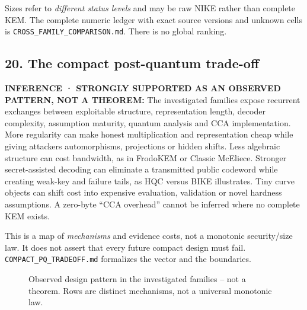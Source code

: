 \documentclass[
  10pt,
  a4paper,
]{article}
\begin{document}
Sizes refer to \emph{different status levels} and may be raw NIKE rather
than complete KEM. The complete numeric ledger with exact source
versions and unknown cells is \texttt{CROSS\_FAMILY\_COMPARISON.md}.
There is no global ranking.

\hypertarget{the-compact-post-quantum-trade-off}{%
\subsection{20. The compact post-quantum
trade-off}\label{the-compact-post-quantum-trade-off}}

\textbf{INFERENCE · STRONGLY SUPPORTED AS AN OBSERVED PATTERN, NOT A
THEOREM:} The investigated families expose recurrent exchanges between
exploitable structure, representation length, decoder complexity,
assumption maturity, quantum analysis and CCA implementation. More
regularity can make honest multiplication and representation cheap while
giving attackers automorphisms, projections or hidden shifts. Less
algebraic structure can cost bandwidth, as in FrodoKEM or Classic
McEliece. Stronger secret-assisted decoding can eliminate a transmitted
public codeword while creating weak-key and failure tails, as HQC versus
BIKE illustrates. Tiny curve objects can shift cost into expensive
evaluation, validation or novel hardness assumptions. A zero-byte ``CCA
overhead'' cannot be inferred where no complete KEM exists.

This is a map of \emph{mechanisms} and evidence costs, not a monotonic
security/size law. It does not assert that every future compact design
must fail. \texttt{COMPACT\_PQ\_TRADEOFF.md} formalizes the vector and
the boundaries.

\begin{figure}[htbp]
\centering
{}
\caption{Observed design pattern in the investigated families -- not a theorem. Rows are distinct mechanisms, not a universal monotonic law.}\label{fig:core}
\end{figure}
\end{document}
